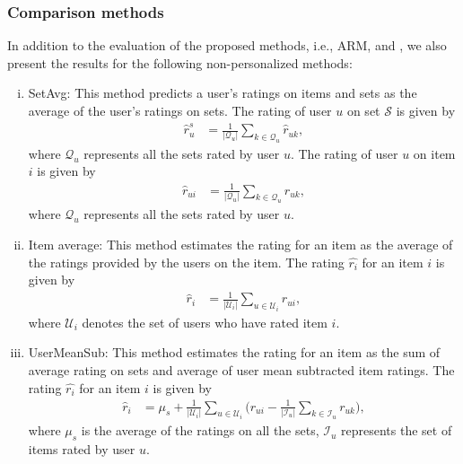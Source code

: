 \subsubsection{Comparison methods}\label{comp_methods}
In addition to the evaluation of the proposed methods, i.e., ARM, \ES 
and \VO, we also present the results for the following non-personalized
methods:
\begin{enumerate}[(i)]
  \item SetAvg: This method predicts a user's ratings on items and sets as the average of the
    user's ratings on sets. The rating of user $u$ on set $\mathcal{S}$ is given
    by
    \begin{equation}
      \begin{split}
        \hat{r}_{u}^s &= \frac{1}{|\mathcal{Q}_u|} \sum_{k \in \mathcal{Q}_u} \hat{r}_{uk}, 
      \end{split}
    \end{equation}
  \noindent where $\mathcal{Q}_u$ represents all the sets rated by user $u$. The
  rating of user $u$ on item $i$ is given by
  \begin{equation}
    \begin{split}
      \hat{r}_{ui} &= \frac{1}{|\mathcal{Q}_u|} \sum_{k \in \mathcal{Q}_u}
      \hat{r}_{uk},
    \end{split}
  \end{equation}
\noindent where $\mathcal{Q}_u$ represents all the sets rated by user $u$.

  \item Item average: This method estimates the rating for an item as the average of the ratings
provided by the users on the item. The rating
$\hat{r_i}$ for an item $i$ is given by
\begin{equation}
  \begin{split}
    \hat{r}_{i} &= \frac{1}{|\mathcal{U}_i|}\sum_{u \in \mathcal{U}_i} r_{ui}, 
  \end{split}
\end{equation}
\noindent where $\mathcal{U}_i$ denotes the set of users who have rated item
$i$. 
 

  \item UserMeanSub: This method estimates the rating for an item as the sum of average rating on
sets and average of user mean subtracted item ratings.
The rating
$\hat{r_i}$ for an item $i$ is given by
\begin{equation}
  \begin{split}
    \hat{r}_{i} &= \mu_s + \frac{1}{|\mathcal{U}_i|}\sum_{u \in \mathcal{U}_i}
    \big(r_{ui} - \frac{1}{|\mathcal{I}_u|}\sum_{k \in \mathcal{I}_u}r_{uk}\big),
  \end{split}
\end{equation} 
\noindent where $\mu_s$ is the average of the ratings on all the sets, $\mathcal{I}_u$
represents the set of items rated by user $u$.

\end{enumerate}

